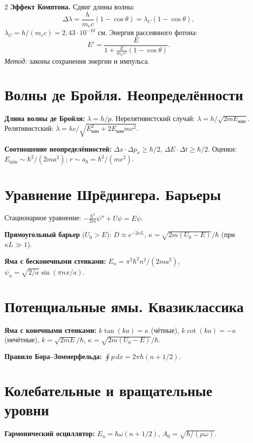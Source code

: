 \documentclass[10pt,a4paper]{article}
\begin{document}
\begin{multicols}{2}
\textbf{Эффект Комптона.} Сдвиг длины волны:
$$\Delta\lambda = \frac{h}{m_e c}(1-\cos\theta) = \lambda_C(1-\cos\theta),$$
$\lambda_C = h/(m_e c) = 2{,}43\cdot10^{-10}$ см.
Энергия рассеянного фотона:
$$E' = \frac{E}{1 + \frac{E}{m_e c^2}(1-\cos\theta)}.$$
\textit{Метод:} законы сохранения энергии и импульса.

\section{Волны де Бройля. Неопределённости}

\textbf{Длина волны де Бройля:} $\lambda = h/p$.
Нерелятивистский случай: $\lambda = h/\sqrt{2mE_{\text{кин}}}$.
Релятивистский: $\lambda = hc/\sqrt{E_{\text{кин}}^2 + 2E_{\text{кин}}mc^2}$.

\textbf{Соотношение неопределённостей:}
$\Delta x\cdot\Delta p_x \geqslant \hbar/2$,
$\Delta E\cdot\Delta t \geqslant \hbar/2$.
Оценки: $E_{\min} \sim \hbar^2/(2ma^2)$; $r \sim a_0 = \hbar^2/(me^2)$.

\section{Уравнение Шрёдингера. Барьеры}

Стационарное уравнение: $-\frac{\hbar^2}{2m}\psi'' + U\psi = E\psi$.

\textbf{Прямоугольный барьер} ($U_0 > E$):
$D \approx e^{-2\kappa L}$, $\kappa = \sqrt{2m(U_0-E)}/\hbar$ (при $\kappa L \gg 1$).

\textbf{Яма с бесконечными стенками:}
$E_n = \pi^2\hbar^2 n^2/(2ma^2)$,
$\psi_n = \sqrt{2/a}\sin(\pi n x/a)$.

\section{Потенциальные ямы. Квазиклассика}

\textbf{Яма с конечными стенками:}
$k\tan(ka) = \kappa$ (чётные), $k\cot(ka) = -\kappa$ (нечётные),
$k = \sqrt{2mE}/\hbar$, $\kappa = \sqrt{2m(U_0-E)}/\hbar$.

\textbf{Правило Бора--Зоммерфельда:}
$\oint p\,dx = 2\pi\hbar(n+1/2)$.

\section{Колебательные и вращательные уровни}

\textbf{Гармонический осциллятор:}
$E_n = \hbar\omega(n+1/2)$,
$A_0 = \sqrt{\hbar/(\mu\omega)}$.


\end{multicols}
\end{document}
